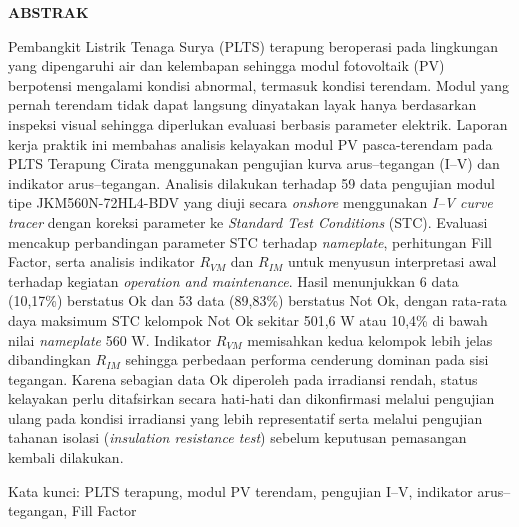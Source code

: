 \clearpage
{}
{}
\begin{center}
    \textbf{ABSTRAK}\\[0.5cm]
\end{center}

Pembangkit Listrik Tenaga Surya (PLTS) terapung beroperasi pada lingkungan yang
dipengaruhi air dan kelembapan sehingga modul fotovoltaik (PV) berpotensi
mengalami kondisi abnormal, termasuk kondisi terendam. Modul yang pernah
terendam tidak dapat langsung dinyatakan layak hanya berdasarkan inspeksi
visual sehingga diperlukan evaluasi berbasis parameter elektrik. Laporan kerja
praktik ini membahas analisis kelayakan modul PV pasca-terendam pada PLTS
Terapung Cirata menggunakan pengujian kurva arus--tegangan (I--V) dan indikator
arus--tegangan. Analisis dilakukan terhadap 59 data pengujian modul tipe
JKM560N-72HL4-BDV yang diuji secara \textit{onshore} menggunakan \textit{I--V
curve tracer} dengan koreksi parameter ke \textit{Standard Test Conditions}
(STC). Evaluasi mencakup perbandingan parameter STC terhadap \textit{nameplate},
perhitungan Fill Factor, serta analisis indikator $R_{VM}$ dan $R_{IM}$ untuk
menyusun interpretasi awal terhadap kegiatan \textit{operation and maintenance}.
Hasil menunjukkan 6 data (10,17\%) berstatus Ok dan 53 data (89,83\%) berstatus
Not Ok, dengan rata-rata daya maksimum STC kelompok Not Ok sekitar 501,6 W atau
10,4\% di bawah nilai \textit{nameplate} 560 W. Indikator $R_{VM}$ memisahkan
kedua kelompok lebih jelas dibandingkan $R_{IM}$ sehingga perbedaan performa
cenderung dominan pada sisi tegangan. Karena sebagian data Ok diperoleh pada
irradiansi rendah, status kelayakan perlu ditafsirkan secara hati-hati dan
dikonfirmasi melalui pengujian ulang pada kondisi irradiansi yang lebih
representatif serta melalui pengujian tahanan isolasi (\textit{insulation
resistance test}) sebelum keputusan pemasangan kembali dilakukan.

\vspace{1em}
\noindent Kata kunci: PLTS terapung, modul PV terendam, pengujian I--V,
indikator arus--tegangan, Fill Factor